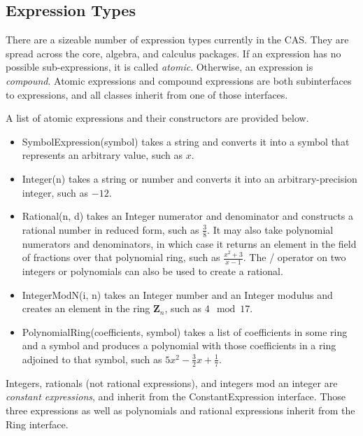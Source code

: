 \documentclass{article}
\begin{document}
\subsection{Expression Types}

There are a sizeable number of expression types currently in the CAS. They are spread across the core, algebra, and calculus packages. If an expression has no possible sub-expressions, it is called \emph{atomic}. Otherwise, an expression is \emph{compound}. Atomic expressions and compound expressions are both subinterfaces to expressions, and all classes inherit from one of those interfaces.

A list of atomic expressions and their constructors are provided below.

\begin{itemize}
    \item {\ttfamily SymbolExpression(symbol)} takes a string and converts it into a symbol that represents an arbitrary value, such as $x$.
    
    \item {\ttfamily Integer(n)} takes a string or number and converts it into an arbitrary-precision integer, such as $-12$.
    
    \item {\ttfamily Rational(n, d)} takes an {\ttfamily Integer} numerator and denominator and constructs a rational number in reduced form, such as $\frac{3}{8}$. It may also take polynomial numerators and denominators, in which case it returns an element in the field of fractions over that polynomial ring, such as $\frac{x^2+3}{x-1}$. The {\ttfamily /} operator on two integers or polynomials can also be used to create a rational.
    
    \item {\ttfamily IntegerModN(i, n)} takes an {\ttfamily Integer} number and an {\ttfamily Integer} modulus and creates an element in the ring $\mathbf{Z}_n$, such as $4\mod 17$.
    
    \item {\ttfamily PolynomialRing(coefficients, symbol)} takes a list of coefficients in some ring and a symbol and produces a polynomial with those coefficients in a ring adjoined to that symbol, such as $5x^2-\frac{3}{2}x+\frac{1}{7}$.
\end{itemize}

Integers, rationals (not rational expressions), and integers mod an integer are \emph{constant expressions}, and inherit from the {\ttfamily ConstantExpression} interface. Those three expressions as well as polynomials and rational expressions inherit from the {\ttfamily Ring} interface.
\end{document}
